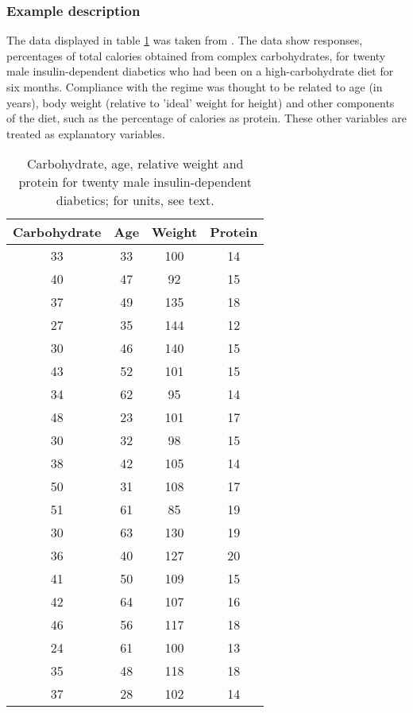 \documentclass[a4paper,11pt]{report}
\begin{document}
\subsubsection*{Example description}

The data displayed in table \ref{tab:bayesglm:carbdata} was taken from
\cite{dobson1983introduction}.  The data show responses, percentages
of total calories obtained from complex carbohydrates, for twenty male
insulin-dependent diabetics who had been on a high-carbohydrate diet
for six months. Compliance with the regime was thought to be related
to age (in years), body weight (relative to 'ideal' weight for height)
and other components of the diet, such as the percentage of calories
as protein. These other variables are treated as explanatory
variables.

\begin{table}[ht!]
    \centering
    \begin{tabular}{c|c|c|c}
        \hline
        Carbohydrate & Age & Weight & Protein \\
        \hline
        33 & 33 & 100 & 14 \\
        40 & 47 & 92  & 15 \\
        37 & 49 & 135 & 18 \\
        27 & 35 & 144 & 12 \\
        30 & 46 & 140 & 15 \\
        43 & 52 & 101 & 15 \\ 
        34 & 62 & 95  & 14 \\
        48 & 23 & 101 & 17 \\ 
        30 & 32 & 98  & 15 \\
        38 & 42 & 105 & 14 \\
        50 & 31 & 108 & 17 \\
        51 & 61 & 85  & 19 \\
        30 & 63 & 130 & 19 \\
        36 & 40 & 127 & 20 \\
        41 & 50 & 109 & 15 \\
        42 & 64 & 107 & 16 \\
        46 & 56 & 117 & 18 \\
        24 & 61 & 100 & 13 \\
        35 & 48 & 118 & 18 \\
        37 & 28 & 102 & 14 \\
        \hline
    \end{tabular}
    \caption{Carbohydrate, age, relative weight and protein for twenty 
        male insulin-dependent diabetics; for units, see text.}
    \label{tab:bayesglm:carbdata}
\end{table}
\end{document}
